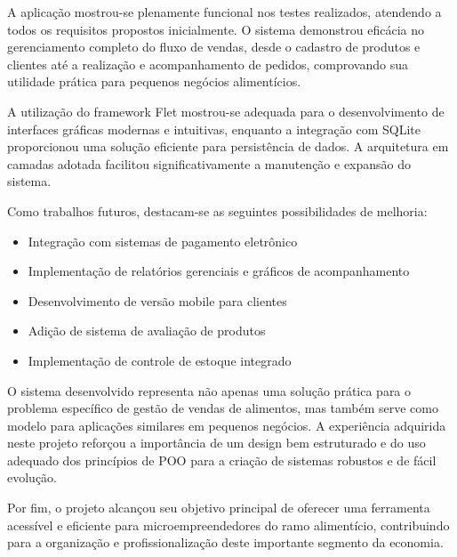 \documentclass[conference]{IEEEtran}
\begin{document}
A aplicação mostrou-se plenamente funcional nos testes realizados, atendendo a todos os requisitos propostos inicialmente. O sistema demonstrou eficácia no gerenciamento completo do fluxo de vendas, desde o cadastro de produtos e clientes até a realização e acompanhamento de pedidos, comprovando sua utilidade prática para pequenos negócios alimentícios.

A utilização do framework Flet mostrou-se adequada para o desenvolvimento de interfaces gráficas modernas e intuitivas, enquanto a integração com SQLite proporcionou uma solução eficiente para persistência de dados. A arquitetura em camadas adotada facilitou significativamente a manutenção e expansão do sistema.

Como trabalhos futuros, destacam-se as seguintes possibilidades de melhoria:
\begin{itemize}
    \item Integração com sistemas de pagamento eletrônico
    \item Implementação de relatórios gerenciais e gráficos de acompanhamento
    \item Desenvolvimento de versão mobile para clientes
    \item Adição de sistema de avaliação de produtos
    \item Implementação de controle de estoque integrado
\end{itemize}

O sistema desenvolvido representa não apenas uma solução prática para o problema específico de gestão de vendas de alimentos, mas também serve como modelo para aplicações similares em pequenos negócios. A experiência adquirida neste projeto reforçou a importância de um design bem estruturado e do uso adequado dos princípios de POO para a criação de sistemas robustos e de fácil evolução.

Por fim, o projeto alcançou seu objetivo principal de oferecer uma ferramenta acessível e eficiente para microempreendedores do ramo alimentício, contribuindo para a organização e profissionalização deste importante segmento da economia.
\end{document}
